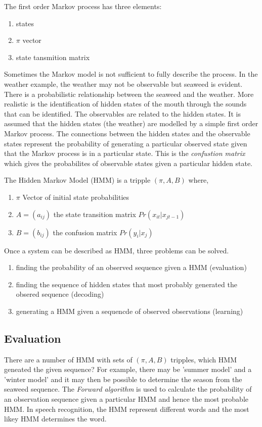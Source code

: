 \documentclass[12pt, a4paper, oneside]{article} %
\begin{document}
The first order Markov process has three elements: 
\begin{enumerate}
\item states
\item $\pi$ vector
\item state tansmition matrix
\end{enumerate}
 Sometimes the Markov model is not sufficient to fully describe the process.  In the weather example, the weather may not be observable but seaweed is evident.  There is a probabilistic relationship between the seaweed and the weather.  More realistic is the identification of hidden states of the mouth through the sounds that can be identified.  The observables are related to the hidden states. It is assumed that the hidden states (the weather) are modelled by a simple first order Markov process.  The connections between the hidden states and the observable states represent the probability of generating a particular observed state given that the Markov process is in a particular state.  This is the \emph{confustion matrix} which gives the probabilites of observable states given a particular hidden state. 
 
The Hidden Markov Model (HMM) is a tripple $(\pi, A, B)$ where, 
\begin{enumerate}
\item $\pi$ Vector of initial state probabilities
\item $A = (a_{ij})$ the state transition matrix $Pr(x_{it}|x_{jt-1})$
\item $B = (b_{ij})$ the confusion matrix $Pr(y_i|x_j)$
\end{enumerate}

Once a system can be described as HMM, three problems can be solved. 
\begin{enumerate}
\item finding the probability of an observed sequence given a HMM (evaluation)
\item finding the sequence of hidden states that most probably generated the obsered sequence (decoding)
\item generating a HMM given a sequencde of observed observations (learning)
\end{enumerate}

\subsection{Evaluation}
There are a number of HMM with sets of $(\pi, A, B)$ tripples, which HMM geneated the given sequence?  For example, there may be 'summer model' and a 'winter model' and it may then be possible to determine the season from the seaweed sequence. The \emph{Forward algorithm} is used to calculate the probability of an observation sequence given a particular HMM and hence the most probable HMM.  In speech recognition, the HMM represent different words and the most likey HMM determines the word. 
\end{document}
